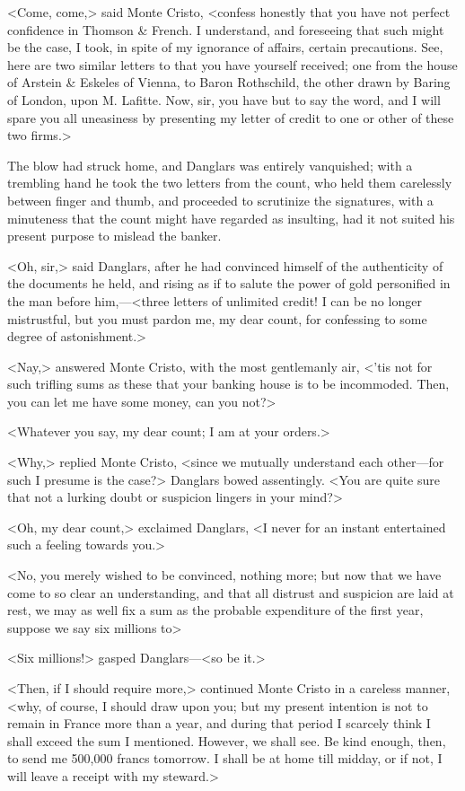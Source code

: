  <Come, come,> said Monte Cristo, <confess honestly that you have not perfect confidence in Thomson \& French. I understand, and foreseeing that such might be the case, I took, in spite of my ignorance of affairs, certain precautions. See, here are two similar letters to that you have yourself received; one from the house of Arstein \& Eskeles of Vienna, to Baron Rothschild, the other drawn by Baring of London, upon M. Lafitte. Now, sir, you have but to say the word, and I will spare you all uneasiness by presenting my letter of credit to one or other of these two firms.> 

 The blow had struck home, and Danglars was entirely vanquished; with a trembling hand he took the two letters from the count, who held them carelessly between finger and thumb, and proceeded to scrutinize the signatures, with a minuteness that the count might have regarded as insulting, had it not suited his present purpose to mislead the banker. 

 <Oh, sir,> said Danglars, after he had convinced himself of the authenticity of the documents he held, and rising as if to salute the power of gold personified in the man before him,—<three letters of unlimited credit! I can be no longer mistrustful, but you must pardon me, my dear count, for confessing to some degree of astonishment.> 

 <Nay,> answered Monte Cristo, with the most gentlemanly air, <'tis not for such trifling sums as these that your banking house is to be incommoded. Then, you can let me have some money, can you not?> 

 <Whatever you say, my dear count; I am at your orders.> 

 <Why,> replied Monte Cristo, <since we mutually understand each other—for such I presume is the case?> Danglars bowed assentingly. <You are quite sure that not a lurking doubt or suspicion lingers in your mind?> 

 <Oh, my dear count,> exclaimed Danglars, <I never for an instant entertained such a feeling towards you.> 

 <No, you merely wished to be convinced, nothing more; but now that we have come to so clear an understanding, and that all distrust and suspicion are laid at rest, we may as well fix a sum as the probable expenditure of the first year, suppose we say six millions to\longdash> 

 <Six millions!> gasped Danglars—<so be it.> 

 <Then, if I should require more,> continued Monte Cristo in a careless manner, <why, of course, I should draw upon you; but my present intention is not to remain in France more than a year, and during that period I scarcely think I shall exceed the sum I mentioned. However, we shall see. Be kind enough, then, to send me 500,000 francs tomorrow. I shall be at home till midday, or if not, I will leave a receipt with my steward.> 

